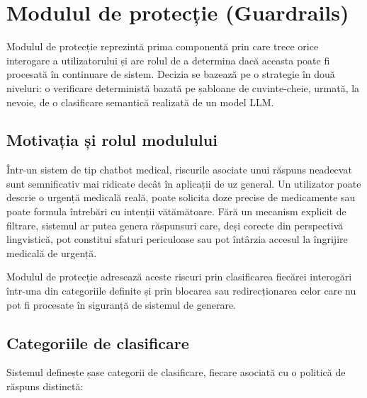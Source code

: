 \documentclass[12pt, a4paper, oneside, romanian]{teza-upb}
\begin{document}
\section{Modulul de protecție (Guardrails)}

Modulul de protecție reprezintă prima componentă prin care trece orice interogare a utilizatorului și are rolul de a determina dacă aceasta poate fi procesată în continuare de sistem. Decizia se bazează pe o strategie în două niveluri: o verificare deterministă bazată pe șabloane de cuvinte-cheie, urmată, la nevoie, de o clasificare semantică realizată de un model LLM.

\subsection{Motivația și rolul modulului}

Într-un sistem de tip chatbot medical, riscurile asociate unui răspuns neadecvat sunt semnificativ mai ridicate decât în aplicații de uz general. Un utilizator poate descrie o urgență medicală reală, poate solicita doze precise de medicamente sau poate formula întrebări cu intenții vătămătoare. Fără un mecanism explicit de filtrare, sistemul ar putea genera răspunsuri care, deși corecte din perspectivă lingvistică, pot constitui sfaturi periculoase sau pot întârzia accesul la îngrijire medicală de urgență.

Modulul de protecție adresează aceste riscuri prin clasificarea fiecărei interogări într-una din categoriile definite și prin blocarea sau redirecționarea celor care nu pot fi procesate în siguranță de sistemul de generare.

\subsection{Categoriile de clasificare}

Sistemul definește șase categorii de clasificare, fiecare asociată cu o politică de răspuns distinctă:
\end{document}
